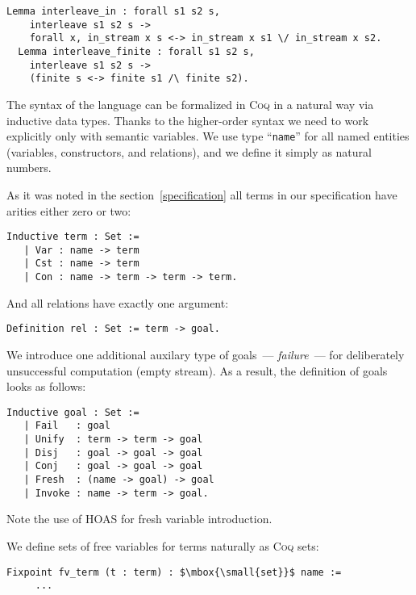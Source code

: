 \begin{lstlisting}[language=Coq]
  Lemma interleave_in : forall s1 s2 s,
    interleave s1 s2 s ->
    forall x, in_stream x s <-> in_stream x s1 \/ in_stream x s2.
  Lemma interleave_finite : forall s1 s2 s,
    interleave s1 s2 s ->
    (finite s <-> finite s1 /\ finite s2).
\end{lstlisting}

The syntax of the language can be formalized in \textsc{Coq} in a natural way via inductive data types. Thanks to the higher-order syntax we need to work explicitly only with semantic variables. We use type ``\lstinline[language=Coq]{name}'' for all named entities (variables, constructors, and relations), and we define it simply as natural numbers.

As it was noted in the section~\ref{specification} all terms in our specification have arities either zero or two:

\begin{lstlisting}[language=Coq] 
   Inductive term : Set :=
   | Var : name -> term
   | Cst : name -> term
   | Con : name -> term -> term -> term.
\end{lstlisting}

And all relations have exactly one argument:

\begin{lstlisting}[language=Coq]
   Definition rel : Set := term -> goal.
\end{lstlisting}

We introduce one additional auxilary type of goals~--- \emph{failure}~--- for deliberately unsuccessful computation (empty stream). As a result, the definition of goals looks as follows:

\begin{lstlisting}[language=Coq] 
   Inductive goal : Set :=
   | Fail   : goal
   | Unify  : term -> term -> goal
   | Disj   : goal -> goal -> goal
   | Conj   : goal -> goal -> goal
   | Fresh  : (name -> goal) -> goal
   | Invoke : name -> term -> goal.
\end{lstlisting}

Note the use of HOAS for fresh variable introduction.

We define sets of free variables for terms naturally as \textsc{Coq} sets:

\begin{lstlisting}[language=Coq,mathescape=true] 
   Fixpoint fv_term (t : term) : $\mbox{\small{set}}$ name :=
     ...
\end{lstlisting}

